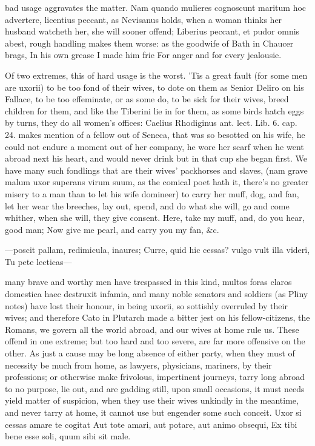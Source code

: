 {bad usage aggravates the matter. Nam quando mulieres cognoscunt maritum
hoc advertere, licentius peccant, as Nevisanus holds, when a
woman thinks her husband watcheth her, she will sooner offend;
Liberius peccant, et pudor omnis abest, rough handling makes them
worse: as the goodwife of Bath in Chaucer brags,
In his own grease I made him frie
For anger and for every jealousie.

Of two extremes, this of hard usage is the worst. 'Tis a great fault
(for some men are uxorii) to be too fond of their wives, to dote on
them as Senior Deliro on his Fallace, to be too effeminate, or as
some do, to be sick for their wives, breed children for them, and like
the  Tiberini lie in for them, as some birds hatch eggs by turns,
they do all women's offices: Caelius Rhodiginus ant. lect. Lib. 6. cap.
24. makes mention of a fellow out of Seneca, that was so besotted
on his wife, he could not endure a moment out of her company, he wore
her scarf when he went abroad next his heart, and would never drink but
in that cup she began first. We have many such fondlings that are their
wives' packhorses and slaves, (nam grave malum uxor superans virum
suum, as the comical poet hath it, there's no greater misery to a man
than to let his wife domineer) to carry her muff, dog, and fan, let her
wear the breeches, lay out, spend, and do what she will, go and come
whither, when she will, they give consent.
Here, take my muff, and, do you hear, good man;
Now give me pearl, and carry you my fan, \&c.

---poscit pallam, redimicula, inaures;
Curre, quid hic cessas? vulgo vult illa videri,
Tu pete lecticas---

many brave and worthy men have trespassed in this kind, multos foras
claros domestica haec destruxit infamia, and many noble senators and
soldiers (as Pliny notes) have lost their honour, in being
uxorii, so sottishly overruled by their wives; and therefore Cato in
Plutarch made a bitter jest on his fellow-citizens, the Romans, we
govern all the world abroad, and our wives at home rule us. These
offend in one extreme; but too hard and too severe, are far more
offensive on the other. As just a cause may be long absence of either
party, when they must of necessity be much from home, as lawyers,
physicians, mariners, by their professions; or otherwise make
frivolous, impertinent journeys, tarry long abroad to no purpose, lie
out, and are gadding still, upon small occasions, it must needs yield
matter of suspicion, when they use their wives unkindly in the
meantime, and never tarry at home, it cannot use but engender some such
conceit.
Uxor si cessas amare te cogitat
Aut tote amari, aut potare, aut animo obsequi,
Ex tibi bene esse soli, quum sibi sit male.

}
